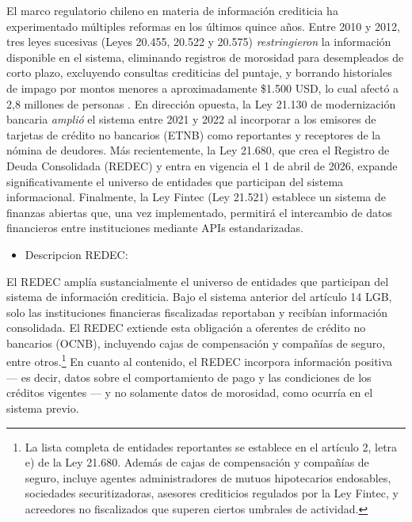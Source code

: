 \documentclass[11pt]{article}
\theoremstyle{plain}
\theoremstyle{plain}
\begin{document}
El marco regulatorio chileno en materia de información crediticia ha experimentado múltiples reformas en los últimos quince años. Entre 2010 y 2012, tres leyes sucesivas (Leyes 20.455, 20.522 y 20.575) \textit{restringieron} la información disponible en el sistema, eliminando registros de morosidad para desempleados de corto plazo, excluyendo consultas crediticias del puntaje, y borrando historiales de impago por montos menores a aproximadamente \$1.500 USD, lo cual afectó a 2,8 millones de personas \parencite{liberman_equilibrium_2018, madeira_impact_2024}. En dirección opuesta, la Ley 21.130 de modernización bancaria \textit{amplió} el sistema entre 2021 y 2022 al incorporar a los emisores de tarjetas de crédito no bancarios (ETNB) como reportantes y receptores de la nómina de deudores. Más recientemente, la Ley 21.680, que crea el Registro de Deuda Consolidada (REDEC) y entra en vigencia el 1 de abril de 2026, expande significativamente el universo de entidades que participan del sistema informacional. Finalmente, la Ley Fintec (Ley 21.521) establece un sistema de finanzas abiertas que, una vez implementado, permitirá el intercambio de datos financieros entre instituciones mediante APIs estandarizadas.
\begin{itemize}
    \item Descripcion REDEC: %
\end{itemize} 
El REDEC amplía sustancialmente el universo de entidades que participan del sistema de información crediticia. Bajo el sistema anterior del artículo 14 LGB, solo las instituciones financieras fiscalizadas reportaban y recibían información consolidada. El REDEC extiende esta obligación a oferentes de crédito no bancarios (OCNB), incluyendo cajas de compensación y compañías de seguro, entre otros.\footnote{La lista completa de entidades reportantes se establece en el artículo 2, letra e) de la Ley 21.680. Además de cajas de compensación y compañías de seguro, incluye agentes administradores de mutuos hipotecarios endosables, sociedades securitizadoras, asesores crediticios regulados por la Ley Fintec, y acreedores no fiscalizados que superen ciertos umbrales de actividad.} En cuanto al contenido, el REDEC incorpora información positiva --- es decir, datos sobre el comportamiento de pago y las condiciones de los créditos vigentes --- y no solamente datos de morosidad, como ocurría en el sistema previo.
\end{document}
